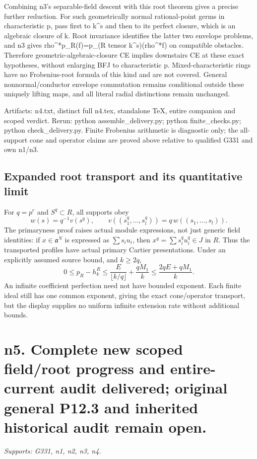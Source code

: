 \documentclass[11pt]{article}
\begin{document}
Combining n3's separable-field descent with this root theorem gives a precise further reduction. For such geometrically normal rational-point germs in characteristic p, pass first to k\textasciicircum{}s and then to its perfect closure, which is an algebraic closure of k. Root invariance identifies the latter two envelope problems, and n3 gives rho\textasciicircum{}*p\_R(f)=p\_(R tensor k\textasciicircum{}s)(rho\textasciicircum{}*f) on compatible obstacles. Therefore geometric-algebraic-closure CE implies downstairs CE at these exact hypotheses, without enlarging BFJ to characteristic p. Mixed-characteristic rings have no Frobenius-root formula of this kind and are not covered. General nonnormal/conductor envelope commutation remains conditional outside these uniquely lifting maps, and all literal radial distinctions remain unchanged.

Artifacts: n4.txt, distinct full n4.tex, standalone TeX, entire companion and scoped verdict. Rerun: python assemble\_delivery.py; python finite\_checks.py; python check\_delivery.py. Finite Frobenius arithmetic is diagnostic only; the all-support cone and operator claims are proved above relative to qualified G331 and own n1/n3.

\subsection*{Expanded root transport and its quantitative limit}
For $q=p^e$ and $S^q\subset R$, all supports obey
\[
 w(s)=q^{-1}v(s^q),\qquad
 v((s_1^q,\ldots,s_l^q))=q\,w((s_1,\ldots,s_l)).
\]
The primaryness proof raises actual module expressions, not just
generic field identities: if $x\in\mathfrak a^N$ is expressed as
$\sum s_i u_i$, then $x^q=\sum s_i^qu_i^q\in J$ in $R$.
Thus the transported profiles have actual primary Cartier presentations.
Under an explicitly assumed source bound, and $k\ge2q$,
\[
 0\le p_R-h_k^R\le
 \frac{E}{\lfloor k/q\rfloor}+\frac{qM_1}{k}
 \le\frac{2qE+qM_1}{k}.
\]
An infinite coefficient perfection need not have bounded exponent.
Each finite ideal still has one common exponent, giving the exact
cone/operator transport, but the display supplies no uniform infinite
extension rate without additional bounds.


\section{n5. Complete new scoped field/root progress and entire-current audit delivered; original general P12.3 and inherited historical audit remain open.}
\textit{Supports: G331, n1, n2, n3, n4.}
\end{document}

